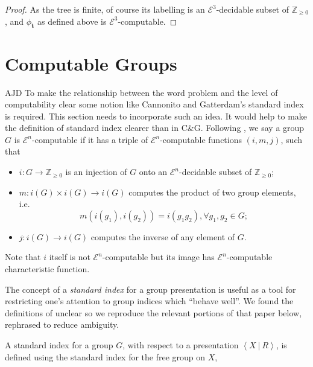 \documentclass[a4paper]{article}
\newcommand{\grz}[1]{$\mathcal{E}^{#1}$}	%
\newcommand{\Zpos}{\mathbb{Z}_{\geq 0}}
\newcommand{\tvec}{\mathbf{t}}	%
\newcommand{\present}[2]{\left \langle #1 \: | \: #2 \right \rangle}	%
\theoremstyle{plain}
\theoremstyle{definition}
\newtheorem{lemma}[theorem]{Lemma}
\newenvironment{ad}{\noindent\color{blue} AJD }{}
\newcommand{\ajd}[1]{
\begin{ad} #1 \end{ad}}
\begin{document}
\begin{proof}
	As the tree is finite, of course its labelling is an \grz{3}-decidable subset of $\Zpos$, and $\phi_{\tvec}$ as defined above is \grz{3}-computable.
\end{proof}

\section{Computable Groups \label{groups}}

\ajd{To make the relationship between the word problem and the level
of computability clear some notion like Cannonito and Gatterdam's standard
index is required. This section needs to incorporate such an idea. It would
help to make the definition of standard index clearer than in C\&G.}  
Following \cite{Cannonito_1966}, we say a group $G$ is \grz{n}-computable if it has a triple of \grz{n}-computable functions $(i,m,j)$, such that

\begin{itemize}
	\item $i: G \rightarrow \Zpos$ is an injection of $G$ onto an \grz{n}-decidable subset of $\Zpos$;
	\item $m: i(G) \times i(G) \rightarrow i(G)$ computes the product of two group elements, i.e.\ 
		\[m \left(i(g_1),i(g_2)\right) = i(g_1g_2), \forall g_1,g_2 \in G;\]
	\item $j: i(G) \rightarrow i(G)$ computes the inverse of any element of $G$.
\end{itemize}

Note that $i$ itself is not \grz{n}-computable but its image has \grz{n}-computable characteristic function.

The concept of a {\it standard index} for a group presentation is useful as a tool for restricting one's attention to group indices which ``behave well''. We found the definitions of \cite{Cannonito_1966} unclear so we reproduce the relevant portions of that paper below, rephrased to reduce ambiguity.

A standard index for a group $G$, with respect to a presentation $\present{X}{R}$, is defined using the standard index for the free group on $X$,

\begin{comment}
	\begin{lemma}\cite[Lemma 3.1]{Cannonito_1973} \label{freegroupindex}
		A free group $F = \langle a_0, \dots \rangle$, on finitely or countably many generators, is \grz{3}-computable.
\end{comment}
\end{document}
